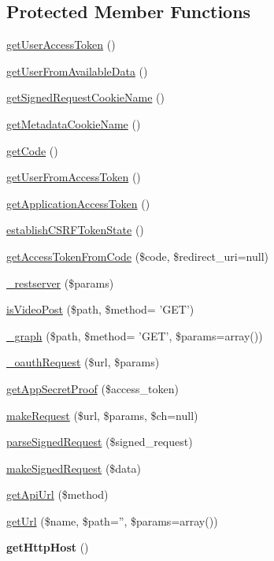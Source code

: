 \subsection*{Protected Member Functions}
\begin{DoxyCompactItemize}
\item 
\hyperlink{classBaseFacebook_afe9aab209768e4d4cc4c959f4dff4310}{get\-User\-Access\-Token} ()
\item 
\hyperlink{classBaseFacebook_ad3dbf5723aa966c9618d1d109526dc4b}{get\-User\-From\-Available\-Data} ()
\item 
\hyperlink{classBaseFacebook_a67b1b4b1b2337a342ed03aa0a8f91ec5}{get\-Signed\-Request\-Cookie\-Name} ()
\item 
\hyperlink{classBaseFacebook_ac73bdb41c831a2176eaea8902fdb7d71}{get\-Metadata\-Cookie\-Name} ()
\item 
\hyperlink{classBaseFacebook_a63452f26d5a4fc7fbcb1732920c1758e}{get\-Code} ()
\item 
\hyperlink{classBaseFacebook_ac67c523b16b29ab94354fd518b4daf06}{get\-User\-From\-Access\-Token} ()
\item 
\hyperlink{classBaseFacebook_a18b991618948872f3f350ee088fea74d}{get\-Application\-Access\-Token} ()
\item 
\hyperlink{classBaseFacebook_a461a0bb17c1aec841d401983e069f06a}{establish\-C\-S\-R\-F\-Token\-State} ()
\item 
\hyperlink{classBaseFacebook_a5cf64ed0104ccf5267e9cee1e73ed783}{get\-Access\-Token\-From\-Code} (\$code, \$redirect\-\_\-uri=null)
\item 
\hyperlink{classBaseFacebook_a3235e3e5d0c4129e919ab2be464fab4e}{\-\_\-restserver} (\$params)
\item 
\hyperlink{classBaseFacebook_a59ec8025b618af99293ac5efc9d88a59}{is\-Video\-Post} (\$path, \$method= 'G\-E\-T')
\item 
\hyperlink{classBaseFacebook_af0966973d145fbb9c2add330a46c7587}{\-\_\-graph} (\$path, \$method= 'G\-E\-T', \$params=array())
\item 
\hyperlink{classBaseFacebook_a87925b6d625110ec3aab4bad3100d4d3}{\-\_\-oauth\-Request} (\$url, \$params)
\item 
\hyperlink{classBaseFacebook_a4c4a0e7108464d75fbcaa4b1be0a857a}{get\-App\-Secret\-Proof} (\$access\-\_\-token)
\item 
\hyperlink{classBaseFacebook_acded7c1ecb37c2745c734f4736b3c8ac}{make\-Request} (\$url, \$params, \$ch=null)
\item 
\hyperlink{classBaseFacebook_a0f155bb002187e66febf73bef11aeb4d}{parse\-Signed\-Request} (\$signed\-\_\-request)
\item 
\hyperlink{classBaseFacebook_a1b9a10f4e44581553ee4cdc5a28455e1}{make\-Signed\-Request} (\$data)
\item 
\hyperlink{classBaseFacebook_a3a844e7cce1bad59e59b7ebdb93baa8a}{get\-Api\-Url} (\$method)
\item 
\hyperlink{classBaseFacebook_a40ca413355e37b68c3649839769bda2b}{get\-Url} (\$name, \$path='', \$params=array())
\item 
\hypertarget{classBaseFacebook_a5fcf8434f74ce2f5624412f6c076003a}{{\bfseries get\-Http\-Host} ()}\label{classBaseFacebook_a5fcf8434f74ce2f5624412f6c076003a}


\end{DoxyCompactItemize}
